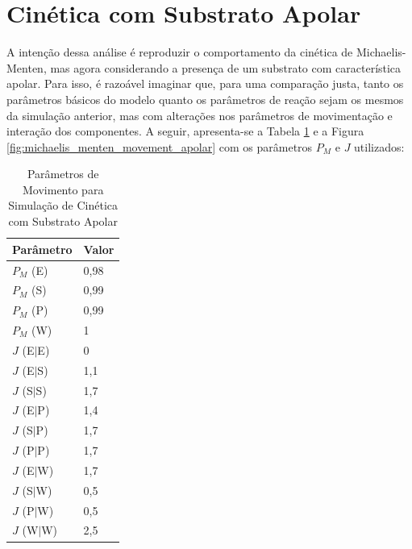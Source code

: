 \documentclass[12pt,oneside]{report}
\begin{document}
\section{Cinética com Substrato Apolar}

A intenção dessa análise é reproduzir o comportamento da cinética de Michaelis-Menten, mas agora considerando a presença de um substrato com característica apolar. Para isso, é razoável imaginar que, para uma comparação justa, tanto os parâmetros básicos do modelo quanto os parâmetros de reação sejam os mesmos da simulação anterior, mas com alterações nos parâmetros de movimentação e interação dos componentes. A seguir, apresenta-se a Tabela \ref{tab:params_movimento_apolar} e a Figura \ref{fig:michaelis_menten_movement_apolar} com os parâmetros $P_M$ e $J$ utilizados:

\begin{table}[H]
    \centering
    \caption{Parâmetros de Movimento para Simulação de Cinética com Substrato Apolar}
    \vspace{0.2cm}
    \begin{tabularx}{\textwidth}{X m{5cm}}
        \hline
        \textbf{Parâmetro} & \textbf{Valor} \\
        \hline
        $P_M$ (E)          & 0{,}98         \\
        $P_M$ (S)          & 0{,}99         \\
        $P_M$ (P)          & 0{,}99         \\
        $P_M$ (W)          & 1              \\
        $J$ (E$|$E)        & 0              \\
        $J$ (E$|$S)        & 1{,}1          \\
        $J$ (S$|$S)        & 1{,}7          \\
        $J$ (E$|$P)        & 1{,}4          \\
        $J$ (S$|$P)        & 1{,}7          \\
        $J$ (P$|$P)        & 1{,}7          \\
        $J$ (E$|$W)        & 1{,}7          \\
        $J$ (S$|$W)        & 0{,}5          \\
        $J$ (P$|$W)        & 0{,}5          \\
        $J$ (W$|$W)        & 2{,}5          \\
        \hline
    \end{tabularx}
    \vspace{0.2cm}
    \label{tab:params_movimento_apolar}
\end{table}
\end{document}
